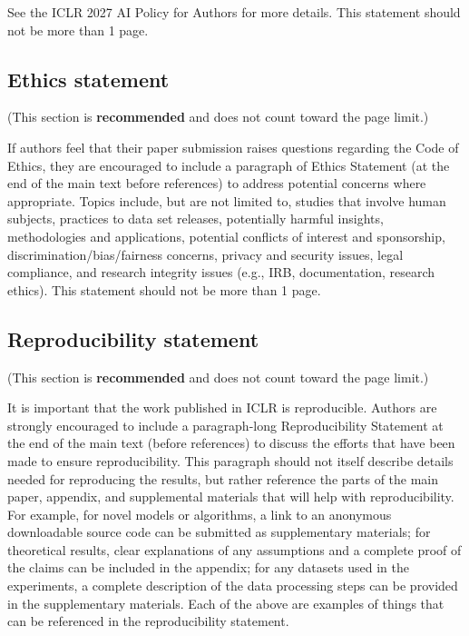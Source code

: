 \documentclass{article} %
\begin{document}
See the ICLR 2027 AI Policy for Authors for more details. This statement should
not be more than 1 page.

\subsection*{Ethics statement}

(This section is \textbf{recommended} and does not count toward the page limit.)

If authors feel that their paper submission raises questions regarding the Code
of Ethics, they are encouraged to include a paragraph of Ethics Statement (at
the end of the main text before references) to address potential concerns where
appropriate. Topics include, but are not limited to, studies that involve human
subjects, practices to data set releases, potentially harmful insights,
methodologies and applications, potential conflicts of interest and sponsorship,
discrimination/bias/fairness concerns, privacy and security issues, legal
compliance, and research integrity issues (e.g., IRB, documentation, research
ethics). This statement should not be more than 1 page.

\subsection*{Reproducibility statement}

(This section is \textbf{recommended} and does not count toward the page limit.)

It is important that the work published in ICLR is reproducible. Authors are
strongly encouraged to include a paragraph-long Reproducibility Statement at the
end of the main text (before references) to discuss the efforts that have been
made to ensure reproducibility. This paragraph should not itself describe
details needed for reproducing the results, but rather reference the parts of
the main paper, appendix, and supplemental materials that will help with
reproducibility. For example, for novel models or algorithms, a link to an
anonymous downloadable source code can be submitted as supplementary materials;
for theoretical results, clear explanations of any assumptions and a complete
proof of the claims can be included in the appendix; for any datasets used in
the experiments, a complete description of the data processing steps can be
provided in the supplementary materials. Each of the above are examples of
things that can be referenced in the reproducibility statement.
\end{document}
